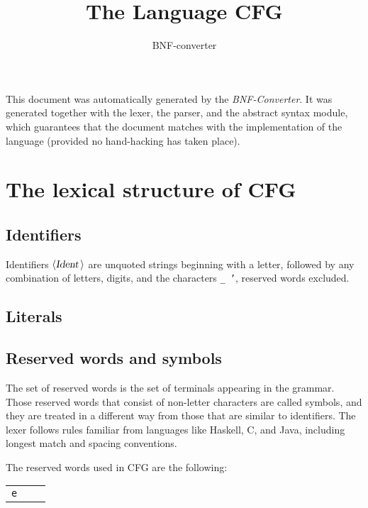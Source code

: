 \documentclass[a4paper,11pt]{article}
\author{BNF-converter}
\title{The Language CFG}
\begin{document}
\maketitle

\newcommand{\emptyP}{\mbox{$\epsilon$}}
\newcommand{\terminal}[1]{\mbox{{\texttt {#1}}}}
\newcommand{\nonterminal}[1]{\mbox{$\langle \mbox{{\sl #1 }} \! \rangle$}}
\newcommand{\arrow}{\mbox{::=}}
\newcommand{\delimit}{\mbox{$|$}}
\newcommand{\reserved}[1]{\mbox{{\texttt {#1}}}}
\newcommand{\literal}[1]{\mbox{{\texttt {#1}}}}
\newcommand{\symb}[1]{\mbox{{\texttt {#1}}}}

This document was automatically generated by the {\em BNF-Converter}. It was generated together with the lexer, the parser, and the abstract syntax module, which guarantees that the document matches with the implementation of the language (provided no hand-hacking has taken place).

\section*{The lexical structure of CFG}
\subsection*{Identifiers}
Identifiers \nonterminal{Ident} are unquoted strings beginning with a letter,
followed by any combination of letters, digits, and the characters {\tt \_ '},
reserved words excluded.


\subsection*{Literals}




\subsection*{Reserved words and symbols}
The set of reserved words is the set of terminals appearing in the grammar. Those reserved words that consist of non-letter characters are called symbols, and they are treated in a different way from those that are similar to identifiers. The lexer follows rules familiar from languages like Haskell, C, and Java, including longest match and spacing conventions.

The reserved words used in CFG are the following: \\

\begin{tabular}{lll}
{\reserved{e}} & & \\
\end{tabular}\\
\end{document}
